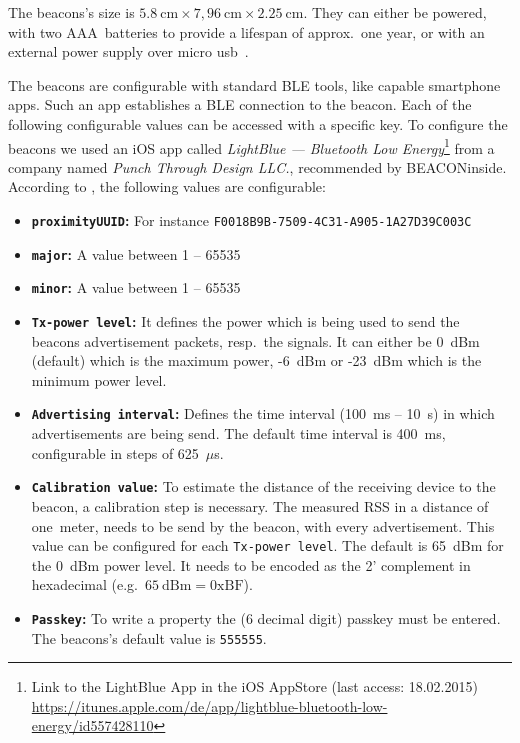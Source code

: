 The beacons's size is $5.8~\text{cm} \times 7,96~\text{cm} \times 2.25~\text{cm}$. They can either be powered, with two AAA~batteries to provide a lifespan of approx.\ one year, or with an external power supply over micro usb~\citep{binside:ds}.

The beacons are configurable with standard \ac{BLE} tools, like capable smartphone apps. Such an app establishes a \ac{BLE} connection to the beacon. Each of the following configurable values can be accessed with a specific key. To configure the beacons we used an iOS app called \emph{LightBlue --- Bluetooth Low Energy}\footnote{Link to the LightBlue App in the iOS AppStore (last access: 18.02.2015) \url{https://itunes.apple.com/de/app/lightblue-bluetooth-low-energy/id557428110}} from a company named \emph{Punch Through Design LLC.}, recommended by BEACONinside. According to \citet{binside:ds}, the following values are configurable:
\begin{itemize}
  \item \textbf{\texttt{proximityUUID}:} For instance \texttt{F0018B9B-7509-4C31-A905-1A27D39C003C}
  \item \textbf{\texttt{major}:} A value between 1 -- 65535
  \item \textbf{\texttt{minor}:} A value between 1 -- 65535
  \item \textbf{\texttt{Tx-power level}:} It defines the power which is being used to send the beacons advertisement packets, resp.\ the signals. It can either be 0~dBm (default) which is the maximum power, -6~dBm or -23~dBm which is the minimum power level.
  \item \textbf{\texttt{Advertising interval}:} Defines the time interval (100~ms -- 10~s) in which advertisements are being send. The default time interval is 400~ms, configurable in steps of 625~$\mu$s.
  \item \textbf{\texttt{Calibration value}:} To estimate the distance of the receiving device to the beacon, a calibration step is necessary. The measured \acs{RSS} in a distance of one~meter, needs to be send by the beacon, with every advertisement. This value can be configured for each \texttt{Tx-power level}. The default is 65~dBm for the 0~dBm power level. It needs to be encoded as the 2' complement in hexadecimal (e.g.\ $65~\text{dBm} = \text{0xBF}$).
  \item \textbf{\texttt{Passkey}:} To write a property the (6 decimal digit) passkey must be entered. The beacons's default value is \texttt{555555}.
\end{itemize}


